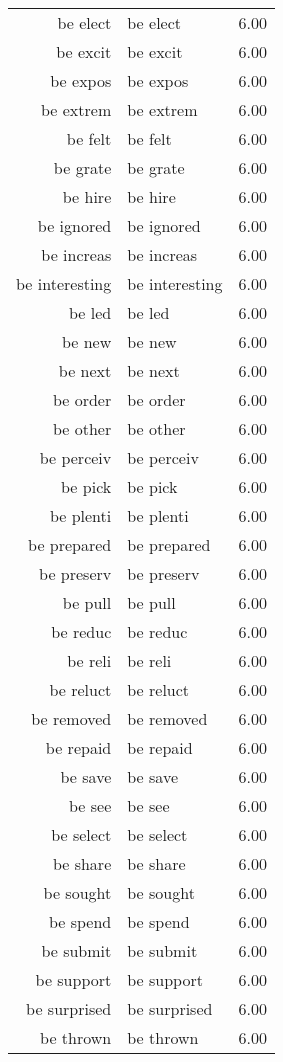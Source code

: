\begin{table}[ht]
\begin{tabular}{rlr}
  be elect & be elect & 6.00 \\ 
  be excit & be excit & 6.00 \\ 
  be expos & be expos & 6.00 \\ 
  be extrem & be extrem & 6.00 \\ 
  be felt & be felt & 6.00 \\ 
  be grate & be grate & 6.00 \\ 
  be hire & be hire & 6.00 \\ 
  be ignored & be ignored & 6.00 \\ 
  be increas & be increas & 6.00 \\ 
  be interesting & be interesting & 6.00 \\ 
  be led & be led & 6.00 \\ 
  be new & be new & 6.00 \\ 
  be next & be next & 6.00 \\ 
  be order & be order & 6.00 \\ 
  be other & be other & 6.00 \\ 
  be perceiv & be perceiv & 6.00 \\ 
  be pick & be pick & 6.00 \\ 
  be plenti & be plenti & 6.00 \\ 
  be prepared & be prepared & 6.00 \\ 
  be preserv & be preserv & 6.00 \\ 
  be pull & be pull & 6.00 \\ 
  be reduc & be reduc & 6.00 \\ 
  be reli & be reli & 6.00 \\ 
  be reluct & be reluct & 6.00 \\ 
  be removed & be removed & 6.00 \\ 
  be repaid & be repaid & 6.00 \\ 
  be save & be save & 6.00 \\ 
  be see & be see & 6.00 \\ 
  be select & be select & 6.00 \\ 
  be share & be share & 6.00 \\ 
  be sought & be sought & 6.00 \\ 
  be spend & be spend & 6.00 \\ 
  be submit & be submit & 6.00 \\ 
  be support & be support & 6.00 \\ 
  be surprised & be surprised & 6.00 \\ 
  be thrown & be thrown & 6.00 \\ 

\end{tabular}
\end{table}

